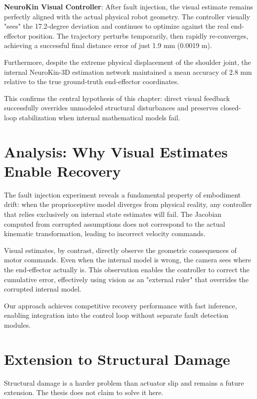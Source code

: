 \documentclass[12pt,a4paper,oneside]{report}
\begin{document}
\textbf{NeuroKin Visual Controller}: After fault injection, the visual estimate remains perfectly aligned with the actual physical robot geometry. The controller visually "sees" the 17.2-degree deviation and continues to optimize against the real end-effector position. The trajectory perturbs temporarily, then rapidly re-converges, achieving a successful final distance error of just 1.9 mm (0.0019 m).

Furthermore, despite the extreme physical displacement of the shoulder joint, the internal NeuroKin-3D estimation network maintained a mean accuracy of 2.8 mm relative to the true ground-truth end-effector coordinates. 

This confirms the central hypothesis of this chapter: direct visual feedback successfully overrides unmodeled structural disturbances and preserves closed-loop stabilization when internal mathematical models fail.

\section{Analysis: Why Visual Estimates Enable Recovery}

The fault injection experiment reveals a fundamental property of embodiment drift: when the proprioceptive model diverges from physical reality, any controller that relies exclusively on internal state estimates will fail. The Jacobian computed from corrupted assumptions does not correspond to the actual kinematic transformation, leading to incorrect velocity commands.

Visual estimates, by contrast, directly observe the geometric consequences of motor commands. Even when the internal model is wrong, the camera sees where the end-effector actually is. This observation enables the controller to correct the cumulative error, effectively using vision as an "external ruler" that overrides the corrupted internal model.

Our approach achieves competitive recovery performance with fast inference, enabling integration into the control loop without separate fault detection modules. 

\section{Extension to Structural Damage}

Structural damage is a harder problem than actuator slip and remains a future extension. The thesis does not claim to solve it here.
\end{document}

